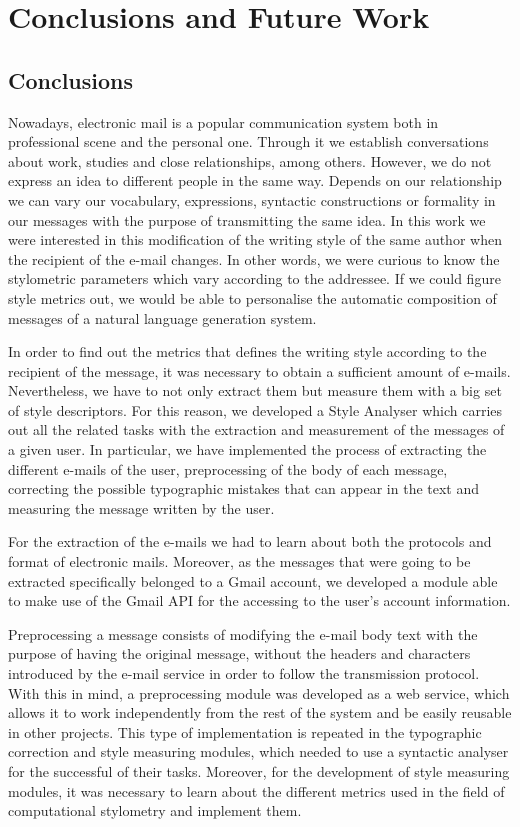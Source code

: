 \chapter{Conclusions and Future Work}
\label{cap:conclusiones}


\section{Conclusions}
Nowadays, electronic mail is a popular communication system both in professional scene and the personal one. Through it we establish conversations about work, studies and close relationships, among others. However, we do not express an idea to different people in the same way. Depends on our relationship we can vary our vocabulary, expressions, syntactic constructions or formality in our messages with the purpose of transmitting the same idea. In this work we were interested in this modification of the writing style of the same author when the recipient of the e-mail changes. In other words, we were curious to know the stylometric parameters which vary according to the addressee. If we could figure  style metrics out, we would be able to personalise the automatic composition of messages of a natural language generation system.

In order to find out the metrics that defines the writing style according to the recipient of the message, it was necessary to obtain a sufficient amount of e-mails. Nevertheless, we have to not only extract them but measure them with a big set of style descriptors. For this reason, we developed a Style Analyser which carries out all the related tasks with the extraction and measurement of the messages of a given user. In particular, we have implemented the process of extracting the different e-mails of the user, preprocessing of the body of each message, correcting the possible typographic mistakes that can appear in the text and measuring the message written by the user.

For the extraction of the e-mails we had to learn about both the protocols and format of electronic mails. Moreover, as the messages that were going to be extracted specifically belonged to a Gmail account, we developed a module able to make use of the Gmail API for the accessing to the user's account information.

Preprocessing a message consists of modifying the e-mail body text with the purpose of having the original message, without the headers and characters introduced by the e-mail service in order to follow the transmission protocol. With this in mind, a preprocessing module was developed as a web service, which allows it to work independently from the rest of the system and be easily reusable in other projects. This type of implementation is repeated in the typographic correction and style measuring modules, which needed to use a syntactic analyser for the successful of their tasks. Moreover, for the development of style measuring modules, it was necessary to learn about the different metrics used in the field of computational stylometry and implement them.

